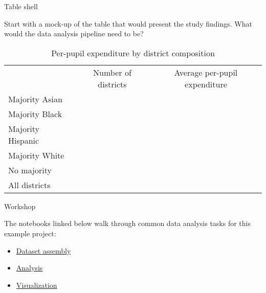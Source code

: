 \documentclass{beamer}
\begin{document}
\begin{frame}{Table shell}

  Start with a mock-up of the table that would present the study findings. What would the data analysis pipeline need to be?

  \begin{table}
    \centering
    \caption*{Per-pupil expenditure by district composition}
    \begin{tabular}{lcc}
      \toprule
      & \multirow{2}{6 em}{\centering Number of districts} & \multirow{2}{10 em}{\centering Average per-pupil expenditure} \\ \\
      \cmidrule(lr){2-3}
      Majority Asian \\
      Majority Black \\
      Majority Hispanic \\
      Majority White \\
      No majority \\
      All districts \\
      \bottomrule
    \end{tabular}
  \end{table}

\end{frame}

\begin{frame}{Workshop}

  The notebooks linked below walk through common data analysis tasks for this example project:

  \begin{itemize}
    \item \href{https://github.com/lavalleedelgado/penn-gse-data-workshop/blob/main/src/01-clean-data.qmd}{Dataset assembly}
    \item \href{https://github.com/lavalleedelgado/penn-gse-data-workshop/blob/main/src/02-run-analysis.qmd}{Analysis}
    \item \href{https://github.com/lavalleedelgado/penn-gse-data-workshop/blob/main/src/03-draw-plots.qmd}{Visualization}
  \end{itemize}

\end{frame}
\end{document}

